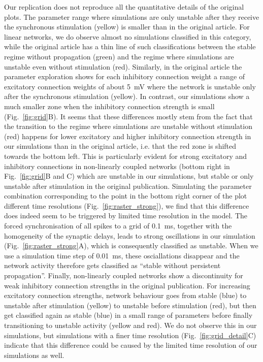 \documentclass[10pt,a4paper,onecolumn]{article}
\begin{document}
Our replication does not reproduce all the quantitative details of the original plots. The parameter range where simulations are only unstable after they receive the synchronous stimulation (yellow) is smaller than in the original article. For linear networks, we do observe almost no simulations classified in this category, while the original article has a thin line of such classifications between the stable regime without propagation (green) and the regime where simulations are unstable even without stimulation (red). Similarly, in the original article the parameter exploration shows for each inhibitory connection weight a range of excitatory connection weights of about \SI{5}{\milli\volt} where the network is unstable only after the synchronous stimulation (yellow). In contrast, our simulations show a much smaller zone when the inhibitory connection strength is small (Fig.~\ref{fig:grid}B). It seems that these differences mostly stem from the fact that the transition to the regime where simulations are unstable without stimulation (red) happens for lower excitatory and higher inhibitory connection strength in our simulations than in the original article, i.e. that the red zone is shifted towards the bottom left. This is particularly evident for strong excitatory and inhibitory connections in non-linearly coupled networks (bottom right in Fig.~\ref{fig:grid}B and C) which are unstable in our simulations, but stable or only unstable after stimulation in the original publication. Simulating the parameter combination corresponding to the point in the bottom right corner of the plot different time resolutions (Fig.~\ref{fig:raster_strong}), we find that this difference does indeed seem to be triggered by limited time resolution in the model. The forced synchronisation of all spikes to a grid of \SI{0.1}{\milli\second}, together with the homogeneity of the synaptic delays, leads to strong oscillations in our simulation (Fig.~\ref{fig:raster_strong}A), which is consequently classified as unstable. When we use a simulation time step of \SI{0.01}{\milli\second}, these osciallations disappear and the network activity therefore gets classified as ``stable without persistent propagation''.  Finally, non-linearly coupled networks show a discontinuity for weak inhibitory connection strengths in the original publication. For increasing excitatory connection strengths, network behaviour goes from stable (blue) to unstable after stimulation (yellow) to unstable before stimulation (red), but then get classified again as stable (blue) in a small range of parameters before finally transitioning to unstable activity (yellow and red). We do not observe this in our simulations, but simulations with a finer time resolution (Fig.~\ref{fig:grid_detail}C) indicate that this difference could be caused by the limited time resolution of our simulations as well.
\end{document}
